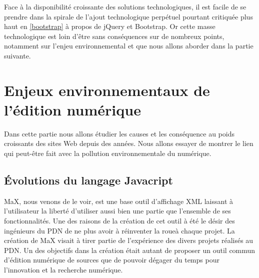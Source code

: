 \documentclass[a4paper,12pt,twoside]{book}
\begin{document}
Face à la disponibilité croissante des solutions technologiques, il est facile de se prendre dans la spirale de l'ajout technologique perpétuel pourtant critiquée plus haut en \ref{bootstrap} à propos de jQuery et Bootstrap. Or cette masse technologique est loin d'être sans conséquences sur de nombreux points, notamment sur l'enjeu environnemental et que nous allons aborder dans la partie suivante.

\chapter{Enjeux environnementaux de l'édition numérique}
Dans cette partie nous allons étudier les causes et les conséquence au poids croissants des sites Web depuis des années. Nous allons essayer de montrer le lien qui peut-être fait avec la pollution environnementale du numérique.

\section{Évolutions du langage Javacript}
MaX, nous venons de le voir, est une base outil d'affichage XML laissant à l'utilisateur la liberté d'utiliser aussi bien une partie que l'ensemble de ses fonctionnalités. Une des raisons de la création de cet outil à été le désir des ingénieurs du \acrshort{PDN} de ne plus avoir à \og réinventer la roue\fg à chaque projet. La création de MaX visait à tirer partie de l'expérience des divers projets réalisés au \acrshort{PDN}. Un des objectifs dans la création était autant de proposer un outil commun d'édition numérique de sources que de pouvoir dégager du temps pour l'innovation et la recherche numérique.
\end{document}
